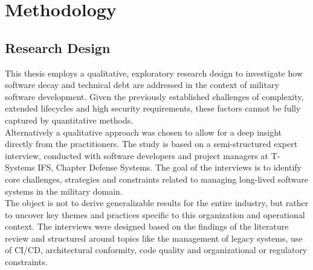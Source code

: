 \section{Methodology}
\subsection{Research Design}
This thesis employs a qualitative, exploratory research design to investigate how software decay and technical debt are addressed in the context of military software development. Given the previously established challenges of complexity, extended lifecycles and high security requirements, these factors
cannot be fully captured by quantitative methods.\\
Alternatively a qualitative approach was chosen to allow for a deep insight directly from the practitioners. The study is based on a semi-structured expert interview, conducted with software developers and project managers at T-Systems IFS, Chapter Defense Systems. 
The goal of the interviews is to identify core challenges, strategies and constraints related to managing long-lived software systems in the military domain.\\
The object is not to derive generalizable results for the entire industry, but rather to uncover key themes and practices specific to this organization and operational context. The interviews were designed based on the findings of the literature review and structured around topics like
the management of legacy systems, use of \ac{CI/CD}, architectural conformity, code quality and organizational or regulatory constraints.\\
